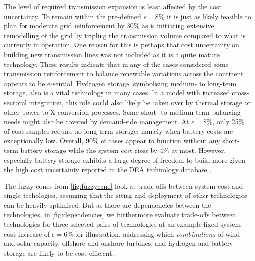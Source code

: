The level of required transmission expansion is least affected by the cost
uncertainty. To remain within the pre-defined $\epsilon=8\%$ it is just as
likely feasible to plan for moderate grid reinforcement by 30\% as is initiating
extensive remodelling of the grid by tripling the transmission volume compared
to what is currently in operation. One reason for this is perhaps that cost
uncertainty on building new transmission lines was not included as it is a quite
mature technology. These results indicate that in any of the cases considered
some transmission reinforcement to balance renewable variations across the
continent appears to be essential. Hydrogen storage, symbolising medium- to
long-term storage, also is a vital technology in many cases. In a model with
increased cross-sectoral integration, this role could also likely be taken over
by thermal storage or other power-to-X conversion processes. Some short- to
medium-term balancing needs might also be covered by demand-side management. At
$\epsilon=8\%$, only 25\% of cost samples require no long-term storage; namely
when battery costs are exceptionally low. Overall, 90\% of cases appear to
function without any short-term battery storage while the system cost rises by
4\% at most. However, especially battery storage exhibits a large degree of
freedom to build more given the high cost uncertainty reported in the DEA
technology database \cite{DEA}.


The fuzzy cones from \cref{fig:fuzzycone} look at trade-offs between system cost
and single techologies, assuming that the siting and deployment of other
technologies can be heavily optimised. But as there are dependencies between the
technologies, in \cref{fig:dependencies} we
furthermore evaluate trade-offs between technologies for three selected pairs of
technologies at an example fixed system cost increase of $\epsilon=6\%$ for
illustration, addressing which \textit{combinations} of wind and solar capacity,
offshore and onshore turbines, and hydrogen and battery storage are likely to be
cost-efficient.

